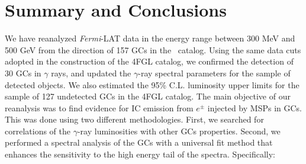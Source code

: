 \documentclass[doublespace,nopageskip]{VTthesis} %
\begin{document}
\section{Summary and Conclusions}\label{sec:conclusion}

We have reanalyzed \textit{Fermi}-LAT data in the energy range between 300 MeV and 500 GeV from the direction of 157 GCs in the~\citet{1996AJ....112.1487H} catalog. Using the same data cuts adopted in the construction of the 4FGL catalog, we confirmed the detection of 30 GCs in $\gamma$ rays, and updated the $\gamma$-ray spectral parameters for the sample of detected objects. We also estimated the 95\% C.L. luminosity upper limits for the sample of 127 undetected GCs in the 4FGL catalog. The main objective of our reanalysis was to find evidence for IC emission from $e^{\pm}$ injected by MSPs in GCs. This was done using two different methodologies. First, we searched for correlations of the $\gamma$-ray luminosities with other GCs properties. Second, we performed a spectral analysis of the GCs with a universal fit method that enhances the sensitivity to the high energy tail of the spectra. Specifically:
\end{document}
